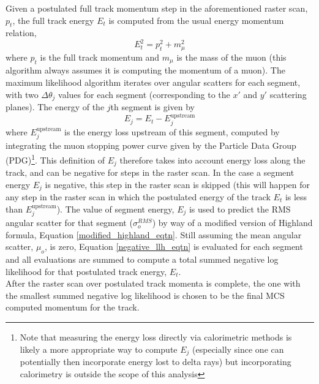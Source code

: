 Given a postulated full track momentum step in the aforementioned raster scan, $p_t$, the full track energy $E_t$ is computed from the usual energy momentum relation,
\begin{equation}\label{energy_momentum_relation_eqtn}
E_t^2 = p_t^2 + m_\mu^2
\end{equation}
 where $p_t$ is the full track momentum and $m_\mu$ is the mass of the muon (this algorithm always assumes it is computing the momentum of a muon). The maximum likelihood algorithm iterates over angular scatters for each segment, with two $\Delta\theta_j$ values for each segment (corresponding to the $x'$ and $y'$ scattering planes). The energy of the $j$th segment is given by
\begin{equation}\label{segment_E_equation}
E_{j} = E_t - E^{\text{upstream}}_{j}
\end{equation}
where $E^{\text{upstream}}_{j}$ is the energy loss upstream of this segment, computed by integrating the muon stopping power curve given by the Particle Data Group (PDG)\cite{stoppingpowersource}\footnote{Note that measuring the energy loss directly via calorimetric methods is likely a more appropriate way to compute $E_j$ (especially since one can potentially then incorporate energy lost to delta rays) but incorporating calorimetry is outside the scope of this analysis}. This definition of $E_j$ therefore takes into account energy loss along the track, and can be negative for steps in the raster scan. In the case a segment energy $E_j$ is negative, this step in the raster scan is skipped (this will happen for any step in the raster scan in which the postulated energy of the track $E_t$ is less than $E^{\text{upstream}}_{j}$). The value of segment energy, $E_j$ is used to predict the RMS angular scatter for that segment ($\sigma_o^{RMS}$) by way of a modified version of Highland formula, Equation \ref{modified_highland_eqtn}. Still assuming the mean angular scatter, $\mu_o$, is zero, Equation \ref{negative_llh_eqtn} is evaluated for each segment and all evaluations are summed to compute a total summed negative log likelihood for that postulated track energy, $E_t$.\\

After the raster scan over postulated track momenta is complete, the one with the smallest summed negative log likelihood is chosen to be the final MCS computed momentum for the track.

